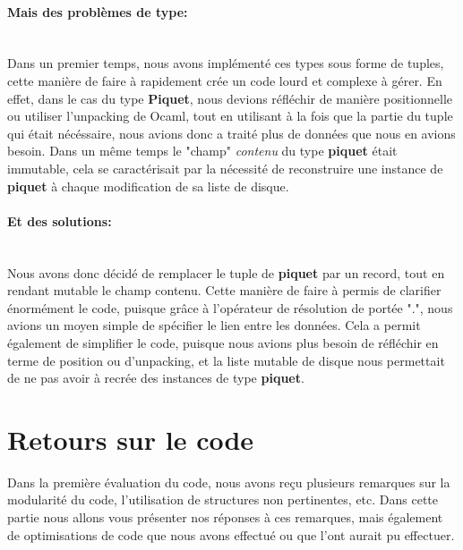 \documentclass[a4paper,11pt]{article}
\begin{document}
\paragraph{Mais des problèmes de type:}\mbox{}\\
Dans un premier temps, nous avons implémenté ces types sous forme de tuples, cette manière de faire à rapidement crée un code lourd et complexe à gérer.
En effet, dans le cas du type \textbf{Piquet}, nous devions réfléchir de manière positionnelle ou utiliser l'unpacking de Ocaml, tout en utilisant à la fois que la partie du tuple qui était nécéssaire, nous avions donc a traité plus de données que nous en avions besoin.
Dans un même temps le "champ" \textit{contenu} du type \textbf{piquet} était immutable,
cela se caractérisait par la nécessité de reconstruire une instance de \textbf{piquet} à chaque modification de sa liste de disque.
\paragraph{Et des solutions:}\mbox{}\\
Nous avons donc décidé de remplacer le tuple de \textbf{piquet} par un record, tout en rendant mutable le champ contenu.
Cette manière de faire à permis de clarifier énormément le code, puisque grâce à l'opérateur de résolution 
de portée ".", nous avions un moyen simple de spécifier le lien entre les données.
Cela a permit également de simplifier le code, puisque nous avions plus besoin de réfléchir en terme de position ou d'unpacking, et la liste mutable de disque nous permettait de ne pas avoir à recrée des instances de type \textbf{piquet}.


\section{Retours sur le code}
Dans la première évaluation du code, nous avons reçu plusieurs remarques sur la modularité du code, l'utilisation de structures non pertinentes, etc.
Dans cette partie nous allons vous présenter nos réponses à ces remarques, mais également de optimisations de code que nous avons effectué ou que l'ont aurait pu effectuer.
\end{document}
